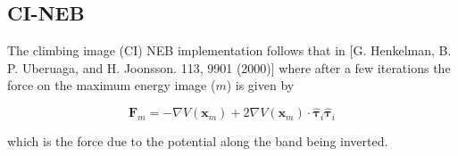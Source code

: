 \documentclass[10pt]{article}
\begin{document}
\subsection{CI-NEB}

The climbing image (CI) NEB implementation follows that in [G. Henkelman, B. P. Uberuaga, and H. Joonsson. 113, 9901 (2000)] where after a few iterations the force on the maximum energy image ($m$) is given by

\begin{equation}
\boldsymbol{F}_{m} = -\nabla V(\boldsymbol{x}_m) + 2\nabla V(\boldsymbol{x}_m)\cdot \hat{\boldsymbol{\tau}}_i\hat{\boldsymbol{\tau}}_i
\end{equation}

which is the force due to the potential along the band being inverted.
\end{document}
